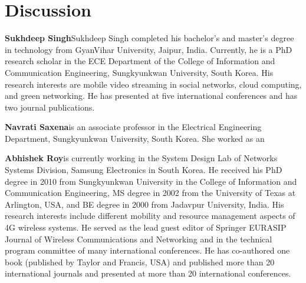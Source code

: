 
\newpage 

\section{Discussion}
\textbf{Sukhdeep Singh}Sukhdeep Singh completed his bachelor’s and master’s degree in technology from GyanVihar University, Jaipur, India. Currently, he is a PhD research scholar in the ECE Department of the College of Information and Communication Engineering, Sungkyunkwan University, South Korea. His research interests are mobile video streaming in social networks, cloud computing, and green networking. He has presented at five international conferences and has two journal publications.\item\textbf{Navrati Saxena}is an associate professor in the Electrical Engineering Department, Sungkyunkwan University, South Korea. She worked as an \item\textbf{Abhishek Roy}is currently working in the System Design Lab of Networks Systems Division, Samsung Electronics in South Korea. He received his PhD degree in 2010 from Sungkyunkwan University in the College of Information and Communication Engineering, MS degree in 2002 from the University of Texas at Arlington, USA, and BE degree in 2000 from Jadavpur University, India. His research interests include different mobility and resource management aspects of 4G wireless systems. He served as the lead guest editor of Springer EURASIP Journal of Wireless Communications and Networking and in the technical program committee of many international conferences. He has co-authored one book (published by Taylor and Francis, USA) and published more than 20 international journals and presented at more than 20 international conferences.


